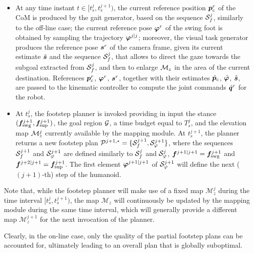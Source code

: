 \begin{itemize}
    \item At any time instant $t \in [t_s^j, t_s^{j+1})$, the current reference
        position ${\bm{p}}_{\rm c}^r$ of the CoM is produced by the gait generator,
        based on the sequence ${\cal S}_f^j$, similarly to the off-line case;
        the current reference pose ${\bm{\varphi}}^r$ of the swing foot is obtained
        by sampling the trajectory ${\bm{\varphi}}^{j|j}$; moreover, the visual task
        generator produces the reference pose ${\bm{s}}^r$ of the camera frame,
        given its current estimate $\hat{{\bm{s}}}$ and the sequence ${\cal S}_f^j$,
        that allows to direct the gaze towards the subgoal extracted from
        ${\cal S}_f^j$, and then to enlarge ${\cal M}_z$ in the area of the
        current destination. 
        References ${\bm{p}}_{\rm c}^r$, ${\bm{\varphi}}^r$, ${\bm{s}}^r$, together with
        their estimates $\hat{{\bm{p}}}_{\rm c}$, $\hat{{\bm{\varphi}}}$, $\hat{{\bm{s}}}$,
        are passed to the kinematic controller to compute the joint commands
        $\dot{{\bm{q}}}^r$ for the robot.
    \item At $t_s^j$, the footstep planner is invoked providing in input the
        stance $({\bm{f}}_{\rm swg}^{j+1}, {\bm{f}}_{\rm sup}^{j+1})$, the goal region
        $\cal G$, a time budget equal to $T_s^j$, and the elevation map
        ${\cal M}_z^j$ currently available by the mapping module.
        At $t_s^{j+1}$, the planner returns a new footstep plan
        ${\cal P}^{j+1,*} = \{ {\cal S}_f^{j+1}, {\cal S}_\varphi^{j+1}\}$, where
        the sequences ${\cal S}_f^{j+1}$ and ${\cal S}_\varphi^{j+1}$ are
        defined similarly to ${\cal S}_f^{j}$ and
        ${\cal S}_\varphi^{j}$, ${\bm{f}}^{j+1|j+1} = {\bm{f}}_{\rm swg}^{j+1}$ and
        ${\bm{f}}^{j+2|j+1} = {\bm{f}}_{\rm sup}^{j+1}$. 
        The first element ${\bm{\varphi}}^{j+1|j+1}$ of ${\cal S}_\varphi^{j+1}$ will
        define the next ($(j+1)$-th) step of the humanoid. 
\end{itemize}

Note that, while the footstep planner will make use of a fixed map
$\mathcal{M}_z^j$ during the time interval $[t_s^j, t_s^{j+1})$, the map
$\mathcal{M}_z$ will continuously be updated by the mapping module during the
same time interval, which will generally provide a different map
$\mathcal{M}_z^{j+1}$ for the next invocation of the planner.

Clearly, in the on-line case, only the quality of the partial footstep plans can
be accounted for, ultimately leading to an overall plan that is globally suboptimal. 

